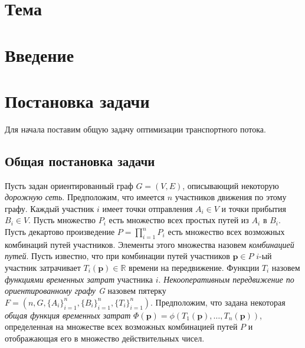 \documentclass[12pt, a4paper]{article}
\begin{document}
\newpage
\pagestyle{plain}
\tableofcontents{}
\newpage	
	
 \section*{Тема}



\section{Введение}


\newpage
\section{Постановка задачи}

Для начала поставим общую задачу оптимизации транспортного потока.


\subsection{Общая постановка задачи}

Пусть задан ориентированный граф $G = (V, E)$, описывающий некоторую \textit{дорожную сеть}. Предположим, что имеется $n$ участников движения по этому графу. Каждый участник $i$ имеет точки отправления $A_i \in V$ и точки прибытия $B_i \in V$. Пусть множество $P_i$ есть множество всех простых путей из $A_i$ в $B_i$. Пусть декартово произведение ${P = \prod \limits_{i = 1} ^ n P_i}$ есть множество всех возможных комбинаций путей участников. Элементы этого множества назовем \textit{комбинацией путей}. Пусть известно, что при комбинации путей участников ${\textbf{p} \in P}$ $i$-ый участник затрачивает $T_i(\textbf{p}) \in \mathbb{R}$ времени на передвижение. 
Функции  $T_i$ назовем \textit{функциями временных затрат} участника $i$.
\textit{Некооперативным передвижение по ориентированному графу G} назовем пятерку $F = (n, G, \{A_i\}_{i = 1}^{n}, \{B_i\}_{i = 1}^{n}, \{T_i\}_{i = 1}^{n})$. Предположим, что задана некоторая \textit{общая функция временных затрат} $\Phi (\textbf{p}) = \phi (T_1 (\textbf{p}), \ldots, T_n(\textbf{p}))$, определенная на множестве всех возможных комбинацией путей $P$ и отображающая его в множество действительных чисел.
\end{document}
